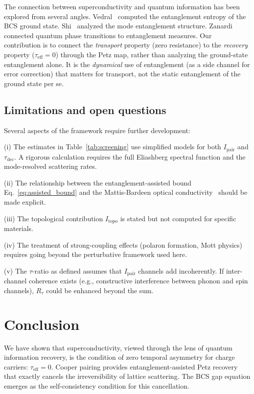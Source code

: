 \documentclass[prb,twocolumn,superscriptaddress,longbibliography,floatfix]{revtex4-2}
\newcommand{\tauasym}{\tau}
\newcommand{\taueff}{\tauasym_{\mathrm{eff}}}
\newcommand{\taudec}{\tauasym_{\mathrm{dec}}}
\newcommand{\Ipair}{I_{\mathrm{pair}}}
\newcommand{\Rtau}{R_{\tauasym}}
\begin{document}
The connection between superconductivity and quantum information
has been explored from several angles.  Vedral~\cite{Vedral2004}
computed the entanglement entropy of the BCS ground state.
Shi~\cite{Shi2004} analyzed the mode entanglement structure.
Zanardi~\cite{Zanardi2002} connected quantum phase transitions
to entanglement measures.  Our contribution is to connect
the \emph{transport} property (zero resistance) to the
\emph{recovery} property ($\taueff = 0$) through the Petz
map, rather than analyzing the ground-state entanglement
alone.  It is the \emph{dynamical} use of entanglement
(as a side channel for error correction) that matters for
transport, not the static entanglement of the ground state
per se.

\subsection{Limitations and open questions}

Several aspects of the framework require further development:

(i) The estimates in Table~\ref{tab:screening} use simplified
models for both $\Ipair$ and $\taudec$.  A rigorous calculation
requires the full Eliashberg spectral function and the
mode-resolved scattering rates.

(ii) The relationship between the entanglement-assisted bound
Eq.~\eqref{eq:assisted_bound} and the Mattis-Bardeen
optical conductivity~\cite{Mattis1958} should be made explicit.

(iii) The topological contribution $I_{\mathrm{topo}}$ is
stated but not computed for specific materials.

(iv) The treatment of strong-coupling effects
(polaron formation, Mott physics) requires going beyond the
perturbative framework used here.

(v) The $\tauasym$-ratio as defined assumes that $\Ipair$
channels add incoherently.  If inter-channel coherence exists
(e.g., constructive interference between phonon and spin
channels), $\Rtau$ could be enhanced beyond the sum.

\section{Conclusion}
\label{sec:conclusion}

We have shown that superconductivity, viewed through the lens
of quantum information recovery, is the condition of zero
temporal asymmetry for charge carriers: $\taueff = 0$.
Cooper pairing provides entanglement-assisted Petz recovery
that exactly cancels the irreversibility of lattice scattering.
The BCS gap equation emerges as the self-consistency condition
for this cancellation.
\end{document}
